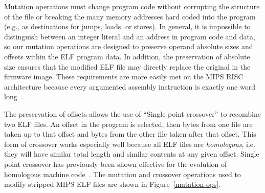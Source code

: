 \documentclass{sig-alternate}
\begin{document}
Mutation operations must change program code without corrupting
the structure of the file or breaking the many memory addresses hard coded
into the program (e.g., as destinations for jumps, loads, or stores).
In general, it is impossible to distinguish between an integer literal
and an address in program code and data, so our mutation operations
are designed to preserve operand absolute sizes and offsets within the
ELF program data.  In addition, the preservation of absolute size
ensures that the modified ELF file may directly replace the original
in the firmware image.  These requirements are more easily met on the
MIPS RISC architecture because every argumented assembly instruction
is exactly one word long~\cite{hennessy1982mips}.

The preservation of offsets allows the use of ``Single point
crossover'' to recombine two ELF files.  An offset in the program
is selected, then bytes from one file are taken up to that offset and
bytes from the other file taken after that offset.  This form of
crossover works especially well because all ELF files are {\em
  homologous}, i.e. they will have similar total length and similar
contents at any given offset.  Single point crossover has previously
been shown effective for the evolution of homologous machine
code~\cite{nordin199912}.  The mutation and crossover operations used
to modify stripped MIPS ELF files are shown in
Figure~\ref{mutation-ops}.
\end{document}
